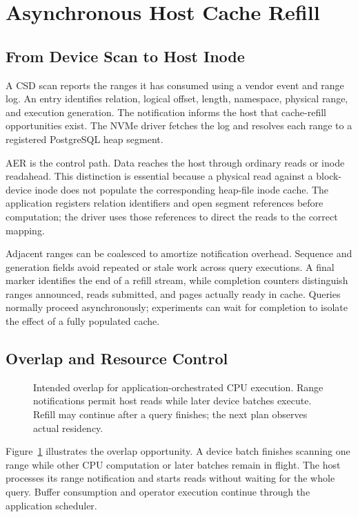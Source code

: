 \documentclass[sigconf, nonacm]{acmart}
\begin{document}
\section{Asynchronous Host Cache Refill}
\label{sec:cache}
\subsection{From Device Scan to Host Inode}
A CSD scan reports the ranges it has consumed using a vendor event and range
log. An entry identifies relation, logical offset, length, namespace,
physical range, and execution generation. The notification informs the host
that cache-refill opportunities exist. The NVMe driver fetches the log and
resolves each range to a registered PostgreSQL heap segment.

AER is the control path. Data reaches the host through ordinary reads or
inode readahead. This distinction is essential because a physical read
against a block-device inode does not populate the corresponding heap-file
inode cache. The application registers relation identifiers and open segment
references before computation; the driver uses those references to direct
the reads to the correct mapping.

Adjacent ranges can be coalesced to amortize notification overhead. Sequence
and generation fields avoid repeated or stale work across query executions.
A final marker identifies the end of a refill stream, while completion
counters distinguish ranges announced, reads submitted, and pages actually
ready in cache. Queries normally proceed asynchronously; experiments can
wait for completion to isolate the effect of a fully populated cache.

\subsection{Overlap and Resource Control}
\begin{figure}[t]
\centering

\caption{Intended overlap for application-orchestrated CPU execution. Range
notifications permit host reads while later device batches execute. Refill
may continue after a query finishes; the next plan observes actual residency.}
\label{fig:timeline}
\end{figure}

Figure~\ref{fig:timeline} illustrates the overlap opportunity. A device batch
finishes scanning one range while other CPU computation or later batches
remain in flight. The host processes its range notification and starts reads
without waiting for the whole query. Buffer consumption and operator
execution continue through the application scheduler.
\end{document}
